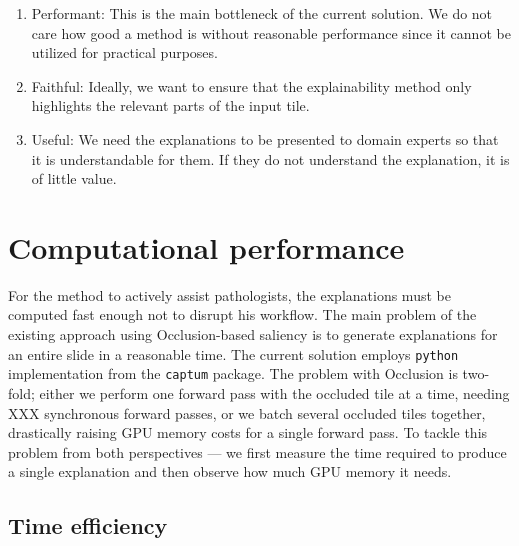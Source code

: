 \begin{enumerate}
    \item Performant: This is the main bottleneck of the current solution. We do not care how good a method is without reasonable performance since it cannot be utilized for practical purposes.
    \item Faithful: Ideally, we want to ensure that the explainability method only highlights the relevant parts of the input tile.
    \item Useful: We need the explanations to be presented to domain experts so that it is understandable for them. If they do not understand the explanation, it is of little value. 
\end{enumerate}

\section{Computational performance}

For the method to actively assist pathologists, the explanations must be computed fast enough not to disrupt his workflow.
The main problem of the existing approach using Occlusion-based saliency is to generate explanations for an entire slide in a reasonable time.
The current solution employs \texttt{python} implementation from the \texttt{captum} package.
The problem with Occlusion is two-fold; either we perform one forward pass with the occluded tile at a time, needing XXX synchronous forward passes, or we batch several occluded tiles together, drastically raising GPU memory costs for a single forward pass.
To tackle this problem from both perspectives --- we first measure the time required to produce a single explanation and then observe how much GPU memory it needs.

\subsection*{Time efficiency}

